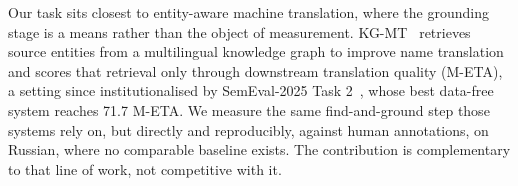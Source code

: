 \documentclass[sigconf,review]{acmart}
\begin{document}
Our task sits closest to entity-aware machine translation, where the
grounding stage is a means rather than the object of measurement.
KG-MT~\citet{conia2024kgmt} retrieves source entities from a multilingual
knowledge graph to improve name translation and scores that retrieval only
through downstream translation quality (M-ETA), a setting since
institutionalised by SemEval-2025 Task 2~\citep{semeval2025eamt}, whose best
data-free system reaches 71.7 M-ETA. We measure the same find-and-ground step
those systems rely on, but directly and reproducibly, against human
annotations, on Russian, where no comparable baseline exists. The
contribution is complementary to that line of work, not competitive with it.



\end{document}
